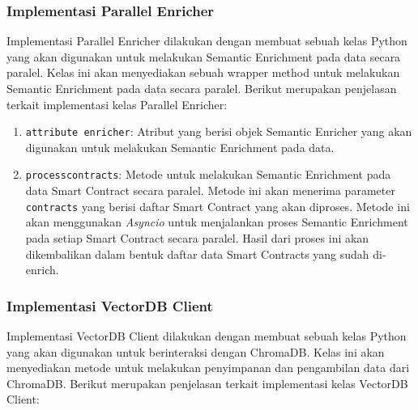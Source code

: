 \subsubsection{Implementasi Parallel Enricher}

Implementasi Parallel Enricher dilakukan dengan membuat sebuah kelas Python yang akan digunakan untuk melakukan Semantic Enrichment pada data secara paralel. Kelas ini akan menyediakan sebuah wrapper method untuk melakukan Semantic Enrichment pada data secara paralel. Berikut merupakan penjelasan terkait implementasi kelas Parallel Enricher:

\begin{enumerate}
	\item \texttt{attribute enricher}: Atribut yang berisi objek Semantic Enricher yang akan digunakan untuk melakukan Semantic Enrichment pada data.
	\item \texttt{process\textunderscore contracts}: Metode untuk melakukan Semantic Enrichment pada data Smart Contract secara paralel. Metode ini akan menerima parameter \texttt{contracts} yang berisi daftar Smart Contract yang akan diproses. Metode ini akan menggunakan \textit{Asyncio} untuk menjalankan proses Semantic Enrichment pada setiap Smart Contract secara paralel. Hasil dari proses ini akan dikembalikan dalam bentuk daftar data Smart Contracts yang sudah di-enrich.
\end{enumerate}

\subsubsection{Implementasi VectorDB Client}

Implementasi VectorDB Client dilakukan dengan membuat sebuah kelas Python yang akan digunakan untuk berinteraksi dengan ChromaDB. Kelas ini akan menyediakan metode untuk melakukan penyimpanan dan pengambilan data dari ChromaDB. Berikut merupakan penjelasan terkait implementasi kelas VectorDB Client:

